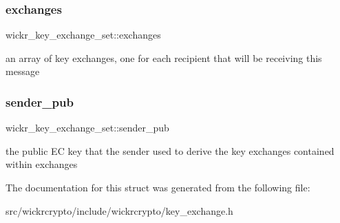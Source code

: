 \subsubsection{\texorpdfstring{exchanges}{exchanges}}
{\footnotesize\ttfamily wickr\+\_\+key\+\_\+exchange\+\_\+set\+::exchanges}

an array of key exchanges, one for each recipient that will be receiving this message \mbox{\label{structwickr__key__exchange__set_ac0b304b3014b3c7bfe181526c2f3fc37}} 
\subsubsection{\texorpdfstring{sender\_pub}{sender\_pub}}
{\footnotesize\ttfamily wickr\+\_\+key\+\_\+exchange\+\_\+set\+::sender\+\_\+pub}

the public EC key that the sender used to derive the key exchanges contained within \textquotesingle{}exchanges\textquotesingle{} 

The documentation for this struct was generated from the following file\+:\begin{DoxyCompactItemize}
\item 
src/wickrcrypto/include/wickrcrypto/key\+\_\+exchange.\+h\end{DoxyCompactItemize}
